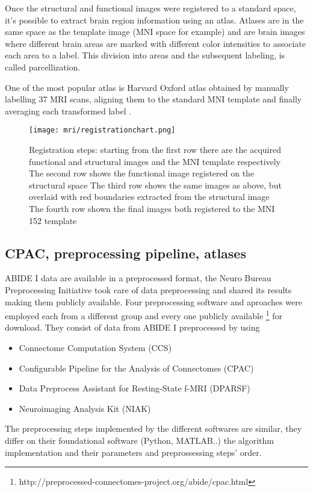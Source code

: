 \documentclass[a4paper,11pt]{article}
\begin{document}
Once the structural and functional images were registered to a standard space, it's possible to extract brain region information using an atlas.
Atlases are in the same space as the template image (MNI space for example) and are brain images where different brain areas are marked with different color intensities to associate each area to a label.
This division into areas and the subsequent labeling, is called parcellization.

One of the most popular atlas is Harvard Oxford atlas obtained by manually labelling 37 MRI scans, aligning them to the standard MNI template and finally averaging each transformed label \cite{chappell-neuroimaging}.


\begin{figure}
\centering
\texttt{[image: mri/registrationchart.png]}
\caption{Registration steps:
 starting from the first row there are the acquired functional and structural images and the MNI template respectively
 The second row shows the functional image registered on the structural space
 The third row shows the same images as above, but overlaid with red boundaries extracted from the structural image
 The fourth row shown the final images both registered to the MNI 152 template
}
\label{fig:registrationchart}
\end{figure}



\subsection{CPAC, preprocessing pipeline, atlases}

ABIDE I data are available in a preprocessed format, the Neuro Bureau Preprocessing Initiative took care of data preprocessing and shared its results making them publicly available.
Four preprocessing software and aproaches were employed each from a different group and every one publicly available \footnote{http://preprocessed-connectomes-project.org/abide/cpac.html} for download.
They consist of data from ABIDE I preprocessed by using
\begin{itemize}
\item Connectome Computation System (CCS)
\item Configurable Pipeline for the Analysis of Connectomes (CPAC)
\item Data Preprocess Assistant for Resting-State f-MRI (DPARSF)
\item Neuroimaging Analysis Kit (NIAK)
\end{itemize}
The preprocessing steps implemented by the different softwares are similar, they differ on their foundational software (Python, MATLAB..) the algorithm implementation and their parameters and preprossessing steps' order.
\end{document}
